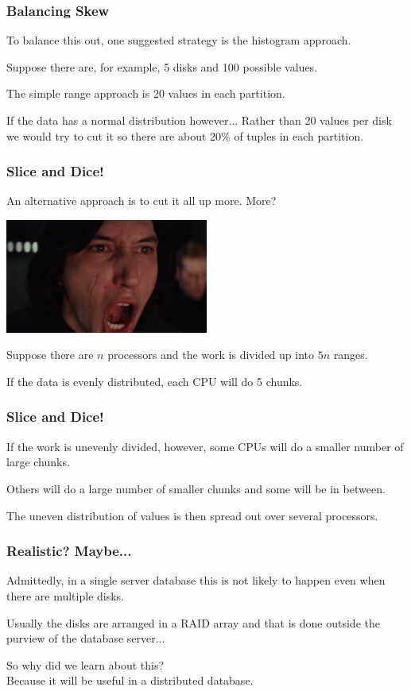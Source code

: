 \begin{frame}
\frametitle{Balancing Skew}

To balance this out, one suggested strategy is the histogram approach. 

Suppose there are, for example, 5 disks and 100 possible values. 

The simple range approach is 20 values in each partition. 

If the data has a normal distribution however... Rather than 20 values per disk we would try to cut it so there are about 20\% of tuples in each partition.

\end{frame}


\begin{frame}
\frametitle{Slice and Dice!}

An alternative approach is to cut it all up more. More?

\begin{center}
	\includegraphics[width=0.5\textwidth]{images/more.jpg}
\end{center}

Suppose there are $n$ processors and the work is divided up into $5n$ ranges. 

If the data is evenly distributed, each CPU will do 5 chunks. 

\end{frame}


\begin{frame}
\frametitle{Slice and Dice!}

If the work is unevenly divided, however, some CPUs will do a smaller number of large chunks.

Others will do a large number of smaller chunks and some will be in between. 

The uneven distribution of values is then spread out over several processors. 


\end{frame}

\begin{frame}
\frametitle{Realistic? Maybe...}

Admittedly, in a single server database this is not likely to happen even when there are multiple disks. 

Usually the disks are arranged in a RAID array and that is done outside the purview of the database server... 

So why did we learn about this? \\
\quad Because it will be useful in a distributed database.

\end{frame}


